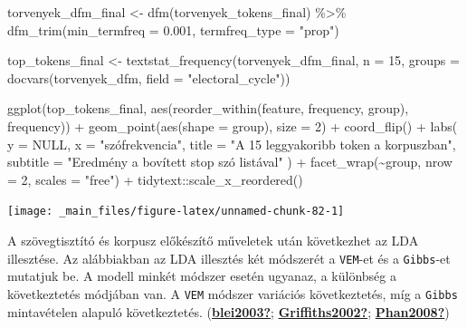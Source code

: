 \documentclass[
]{book}
\newenvironment{Shaded}{\begin{snugshade}}{\end{snugshade}}
\newcommand{\AttributeTok}[1]{\textcolor[rgb]{0.77,0.63,0.00}{#1}}
\newcommand{\ConstantTok}[1]{\textcolor[rgb]{0.00,0.00,0.00}{#1}}
\newcommand{\DecValTok}[1]{\textcolor[rgb]{0.00,0.00,0.81}{#1}}
\newcommand{\FloatTok}[1]{\textcolor[rgb]{0.00,0.00,0.81}{#1}}
\newcommand{\FunctionTok}[1]{\textcolor[rgb]{0.00,0.00,0.00}{#1}}
\newcommand{\NormalTok}[1]{#1}
\newcommand{\OtherTok}[1]{\textcolor[rgb]{0.56,0.35,0.01}{#1}}
\newcommand{\SpecialCharTok}[1]{\textcolor[rgb]{0.00,0.00,0.00}{#1}}
\newcommand{\StringTok}[1]{\textcolor[rgb]{0.31,0.60,0.02}{#1}}
\begin{document}
\begin{Shaded}
\begin{Highlighting}[]
\NormalTok{torvenyek\_dfm\_final }\OtherTok{\textless{}{-}} \FunctionTok{dfm}\NormalTok{(torvenyek\_tokens\_final) }\SpecialCharTok{\%\textgreater{}\%}
  \FunctionTok{dfm\_trim}\NormalTok{(}\AttributeTok{min\_termfreq =} \FloatTok{0.001}\NormalTok{, }\AttributeTok{termfreq\_type =} \StringTok{"prop"}\NormalTok{)}

\NormalTok{top\_tokens\_final }\OtherTok{\textless{}{-}} \FunctionTok{textstat\_frequency}\NormalTok{(torvenyek\_dfm\_final, }\AttributeTok{n =} \DecValTok{15}\NormalTok{, }\AttributeTok{groups =} \FunctionTok{docvars}\NormalTok{(torvenyek\_dfm, }\AttributeTok{field =} \StringTok{"electoral\_cycle"}\NormalTok{))}

\FunctionTok{ggplot}\NormalTok{(top\_tokens\_final, }\FunctionTok{aes}\NormalTok{(}\FunctionTok{reorder\_within}\NormalTok{(feature, frequency, group), frequency)) }\SpecialCharTok{+}
  \FunctionTok{geom\_point}\NormalTok{(}\FunctionTok{aes}\NormalTok{(}\AttributeTok{shape =}\NormalTok{ group), }\AttributeTok{size =} \DecValTok{2}\NormalTok{) }\SpecialCharTok{+}
  \FunctionTok{coord\_flip}\NormalTok{() }\SpecialCharTok{+}
  \FunctionTok{labs}\NormalTok{(}
    \AttributeTok{y =} \ConstantTok{NULL}\NormalTok{,}
    \AttributeTok{x =} \StringTok{"szófrekvencia"}\NormalTok{,}
    \AttributeTok{title =} \StringTok{"A 15 leggyakoribb token a korpuszban"}\NormalTok{,}
    \AttributeTok{subtitle =} \StringTok{"Eredmény a bovített stop szó listával"}
\NormalTok{  ) }\SpecialCharTok{+}
  \FunctionTok{facet\_wrap}\NormalTok{(}\SpecialCharTok{\textasciitilde{}}\NormalTok{group, }\AttributeTok{nrow =} \DecValTok{2}\NormalTok{, }\AttributeTok{scales =} \StringTok{"free"}\NormalTok{) }\SpecialCharTok{+}
\NormalTok{  tidytext}\SpecialCharTok{::}\FunctionTok{scale\_x\_reordered}\NormalTok{()}
\end{Highlighting}
\end{Shaded}

\begin{center}\texttt{[image: \_main\_files/figure-latex/unnamed-chunk-82-1]} \end{center}

A szövegtisztító és korpusz előkészítő műveletek után következhet az LDA
illesztése. Az alábbiakban az LDA illesztés két módszerét a
\texttt{VEM}-et és a \texttt{Gibbs}-et mutatjuk be. A modell minkét
módszer esetén ugyanaz, a különbség a következtetés módjában van. A
\texttt{VEM} módszer variációs következtetés, míg a \texttt{Gibbs}
mintavételen alapuló következtetés.
(\protect\hyperlink{ref-blei2003}{\textbf{blei2003?}};
\protect\hyperlink{ref-Griffiths2002}{\textbf{Griffiths2002?}};
\protect\hyperlink{ref-Phan2008}{\textbf{Phan2008?}})
\end{document}

